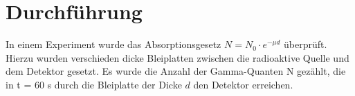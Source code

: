 \section{Durchführung}
\label{sec:Durchführung}

In einem Experiment wurde das Absorptionsgesetz $N = N_0 \cdot e^{-μd}$  überprüft.
Hierzu wurden verschieden dicke Bleiplatten zwischen die radioaktive Quelle und
dem Detektor gesetzt. Es wurde die Anzahl der Gamma-Quanten N gezählt, die
in t = 60 s durch die Bleiplatte der Dicke $d$ den Detektor erreichen.